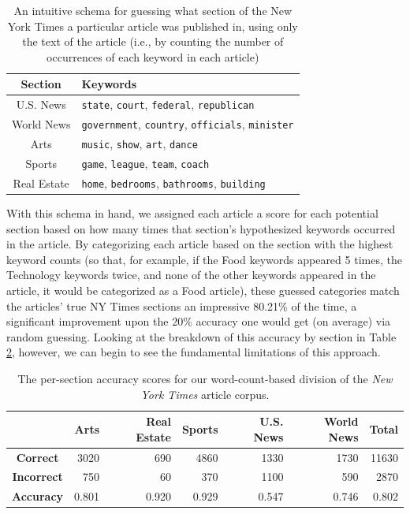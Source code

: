 \documentclass[11pt]{article}
\begin{document}
\begin{table}[ht!]
	\centering
	\begin{tabular}{cl}
		\toprule
		\textbf{Section} & \textbf{Keywords} \\
		\midrule
		U.S. News & \texttt{state}, \texttt{court}, \texttt{federal}, \texttt{republican} \\
		World News & \texttt{government}, \texttt{country}, \texttt{officials}, \texttt{minister} \\
		Arts & \texttt{music}, \texttt{show}, \texttt{art}, \texttt{dance} \\
		Sports & \texttt{game}, \texttt{league}, \texttt{team}, \texttt{coach} \\
		Real Estate & \texttt{home}, \texttt{bedrooms}, \texttt{bathrooms}, \texttt{building} \\
	\end{tabular}
	\caption{An intuitive schema for guessing what section of the New York Times a particular article was published in, using only the text of the article (i.e., by counting the number of occurrences of each keyword in each article)}
	\label{tab:nytimes}
\end{table}

With this schema in hand, we assigned each article a score for each potential section based on how many times that section's hypothesized keywords occurred in the article. By categorizing each article based on the section with the highest keyword counts (so that, for example, if the Food keywords appeared 5 times, the Technology keywords twice, and none of the other keywords appeared in the article, it would be categorized as a Food article), these guessed categories match the articles' true NY Times sections an impressive 80.21\% of the time, a significant improvement upon the 20\% accuracy one would get (on average) via random guessing. Looking at the breakdown of this accuracy by section in Table \ref{tab:nytimes-sections}, however, we can begin to see the fundamental limitations of this approach.

\begin{table}[ht!]
	\centering
	\begin{tabular}{crrrrrr}
		\toprule
		& \textbf{Arts} & \textbf{Real Estate} & \textbf{Sports} & \textbf{U.S. News} & \textbf{World News} & \textbf{Total} \\
		\midrule
		\textbf{Correct} & 3020 & 690 & 4860 & 1330 & 1730 & 11630 \\
		\textbf{Incorrect} & 750 & 60 & 370 & 1100 & 590 & 2870 \\
		\midrule
		\textbf{Accuracy} & 0.801 & 0.920 & 0.929 & 0.547 & 0.746 & 0.802 \\
		\bottomrule
	\end{tabular}
	\caption{The per-section accuracy scores for our word-count-based division of the \textit{New York Times} article corpus.}
	\label{tab:nytimes-sections}
\end{table}
\end{document}
